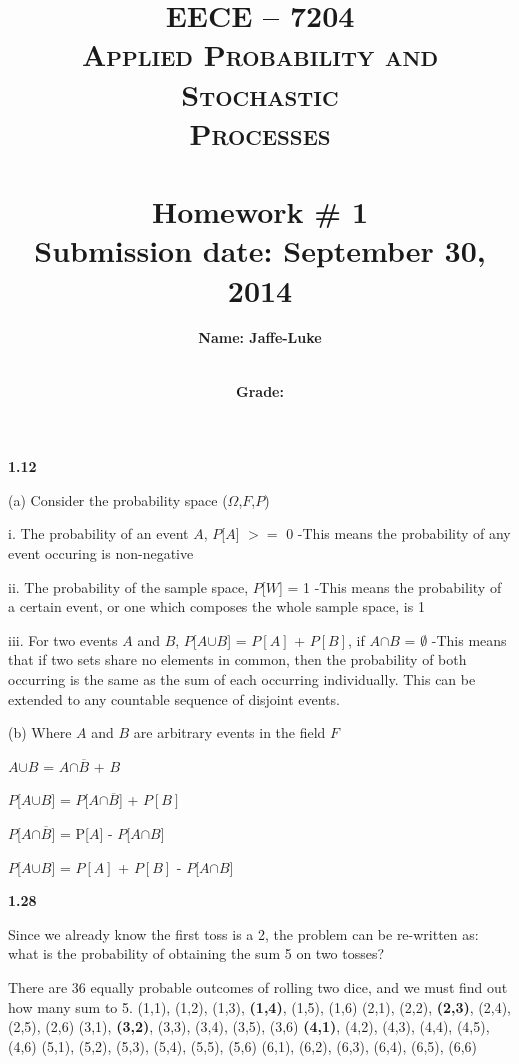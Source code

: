 \documentclass{report}
\title{	\vspace{-2in}
\normalfont \normalsize 
\textsc{\Huge EECE -- 7204 \\Applied Probability and Stochastic \\ [10 pt]Processes} \\ [50pt] 
\horrule{0.5pt} \\[0.4cm] 
\huge Homework \# 1   \\ [15pt]
\normalsize Submission date: September 30, 2014
\horrule{2pt} \\[0.5cm] 
}
\author{ \vspace{3in}\huge \textbf{Name: Jaffe-Luke} \\ 
[55pt] \horrule{2pt} \\[0.5cm] }
\date{\textbf{Grade: }}
\begin{document}
\maketitle
\newpage

\textbf{1.12}
\newline

(a) Consider the probability space ($\Omega$,$F$,$P$)

i. The probability of an event $A$, $P$[$A$] $>=$ 0
\newline -This means the probability of any event occuring is non-negative

ii. The probability of the sample space, $P$[$W$] = 1
\newline -This means the probability of a certain event, or one which composes the whole sample space, is 1

iii. For two events $A$ and $B$, $P$[$A$$\cup$$B$] = $P[A]$ + $P[B]$, if $A$$\cap$$B$ = $\emptyset$
\newline -This means that if two sets share no elements in common, then the probability of both occurring is the same as the sum of each occurring individually. This can be extended to any countable sequence of disjoint events.
\newline

(b) Where $A$ and $B$ are arbitrary events in the field $F$

$A$$\cup$$B$ = $A$$\cap$$\overline{B}$ + $B$

$P$[$A$$\cup$$B$] = $P$[$A$$\cap$$\overline{B}$] + $P[B]$

$P$[$A$$\cap$$\overline{B}$] = P[$A$] - $P$[$A$$\cap$$B$]

$P$[$A$$\cup$$B$] = $P[A]$ + $P[B]$ - $P$[$A$$\cap$$B$]
\newline

\textbf{1.28}

Since we already know the first toss is a 2, the problem can be re-written as: what is the probability of obtaining the sum 5 on two tosses?

There are 36 equally probable outcomes of rolling two dice, and we must find out how many sum to 5.
\newline
(1,1), (1,2), (1,3), \textbf{(1,4)}, (1,5), (1,6) \newline
(2,1), (2,2), \textbf{(2,3)}, (2,4), (2,5), (2,6) \newline
(3,1), \textbf{(3,2)}, (3,3), (3,4), (3,5), (3,6) \newline
\textbf{(4,1)}, (4,2), (4,3), (4,4), (4,5), (4,6) \newline
(5,1), (5,2), (5,3), (5,4), (5,5), (5,6) \newline
(6,1), (6,2), (6,3), (6,4), (6,5), (6,6) \newline
\end{document}
